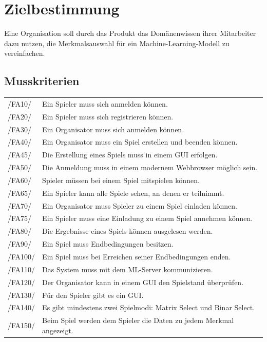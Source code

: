 \documentclass[a4paper]{scrreprt}
\begin{document}
    \chapter{Zielbestimmung}
    Eine Organisation soll durch das \Gls{Produkt} das Domänenwissen ihrer Mitarbeiter dazu nutzen, die Merkmalsauswahl für ein Machine-Learning-Modell zu vereinfachen.

    \section{Musskriterien}
    \begin{tabular}{ l l}
        /FA10/ & Ein \Gls{Spieler} muss sich anmelden können. \\
        /FA20/ & Ein \Gls{Spieler} muss sich registrieren können. \\
        /FA30/ & Ein \Gls{Organisator} muss sich anmelden können. \\
        /FA40/ & Ein \Gls{Organisator} muss ein \Gls{Spiel} erstellen und beenden können. \\
        /FA45/ & Die Erstellung eines Spiels muss in einem GUI erfolgen. \\
        /FA50/ & Die Anmeldung muss in einem modernem \Gls{Webbrowser} möglich sein. \\
        /FA60/ & \Gls{Spieler} müssen bei einem \Gls{Spiel} mitspielen können. \\
        /FA65/ & Ein \Gls{Spieler} kann alle Spiele sehen, an denen er teilnimmt. \\
        /FA70/ & Ein \Gls{Organisator} muss \Gls{Spieler} zu einem \Gls{Spiel} einladen können. \\
        /FA75/ & Ein \Gls{Spieler} muss eine Einladung zu einem Spiel annehmen können. \\
        /FA80/ & Die Ergebnisse eines \Gls{Spiel}s können ausgelesen werden. \\
        /FA90/ & Ein Spiel muss Endbedingungen besitzen. \\
        /FA100/ & Ein Spiel muss bei Erreichen seiner Endbedingungen enden. \\
        /FA110/ & Das System muss mit dem \Gls{ML-Server} kommunizieren. \\
        /FA120/ & Der Organisator kann in einem GUI den Spielstand überprüfen.\\
        /FA130/ & Für den Spieler gibt es ein GUI. \\
        /FA140/ & Es gibt mindestens zwei Spielmodi: \Gls{Matrix Select} und \Gls{Binar Select}. \\
        /FA150/ & Beim Spiel werden dem Spieler die Daten zu jedem Merkmal angezeigt. \\ 
    \end{tabular}
\end{document}
